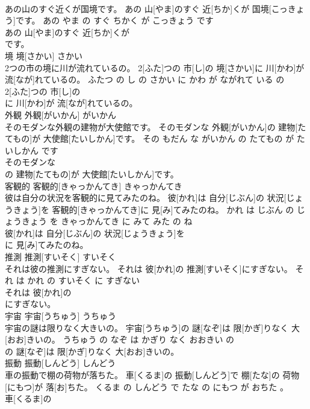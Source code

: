 \documentclass[8pt]{extreport}
\begin{document}
\begin{CJK}{UTF8}{min}
\\	あの山のすぐ近くが国境です。	あの 山[やま]のすぐ 近[ちか]くが 国境[こっきょう]です。	あの やま の すぐ ちかく が こっきょう です	
\\	あの 山[やま]のすぐ 近[ちか]くが
\\	です。			
\\	境	境[さかい]	さかい	
\\	2つの市の境に川が流れているの。	2[ふた]つの 市[し]の 境[さかい]に 川[かわ]が 流[なが]れているの。	ふたつ の し の さかい に かわ が ながれて いる の	
\\	2[ふた]つの 市[し]の
\\	に 川[かわ]が 流[なが]れているの。			
\\	外観	外観[がいかん]	がいかん	
\\	そのモダンな外観の建物が大使館です。	そのモダンな 外観[がいかん]の 建物[たてもの]が 大使館[たいしかん]です。	その もだん な がいかん の たてもの が たいしかん です	
\\	そのモダンな
\\	の 建物[たてもの]が 大使館[たいしかん]です。			
\\	客観的	客観的[きゃっかんてき]	きゃっかんてき	
\\	彼は自分の状況を客観的に見てみたのね。	彼[かれ]は 自分[じぶん]の 状況[じょうきょう]を 客観的[きゃっかんてき]に 見[み]てみたのね。	かれ は じぶん の じょうきょう を きゃっかんてき に みて みた の ね	
\\	彼[かれ]は 自分[じぶん]の 状況[じょうきょう]を
\\	に 見[み]てみたのね。			
\\	推測	推測[すいそく]	すいそく	
\\	それは彼の推測にすぎない。	それは 彼[かれ]の 推測[すいそく]にすぎない。	それ は かれ の すいそく に すぎない	
\\	それは 彼[かれ]の
\\	にすぎない。			
\\	宇宙	宇宙[うちゅう]	うちゅう	
\\	宇宙の謎は限りなく大きいの。	宇宙[うちゅう]の 謎[なぞ]は 限[かぎ]りなく 大[おお]きいの。	うちゅう の なぞ は かぎり なく おおきい の	
\\	の 謎[なぞ]は 限[かぎ]りなく 大[おお]きいの。			
\\	振動	振動[しんどう]	しんどう	
\\	車の振動で棚の荷物が落ちた。	車[くるま]の 振動[しんどう]で 棚[たな]の 荷物[にもつ]が 落[お]ちた。	くるま の しんどう で たな の にもつ が おちた 。	
\\	車[くるま]の

\end{CJK}
\end{document}
